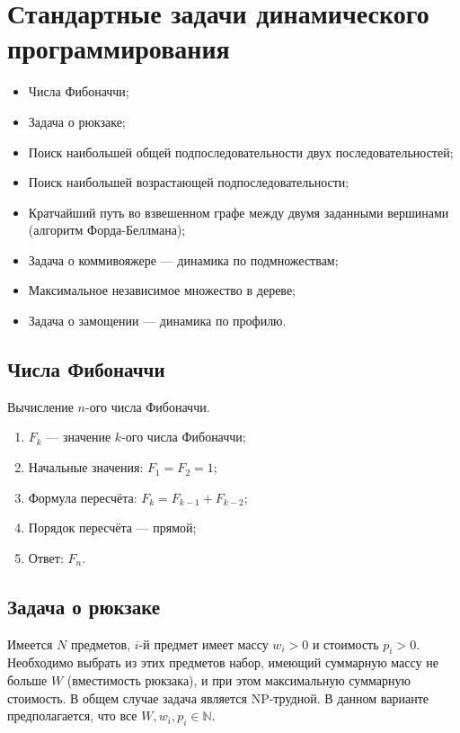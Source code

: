 \section{Стандартные задачи динамического программирования}

\begin{itemize}
\item Числа Фибоначчи;
\item Задача о рюкзаке;
\item Поиск наибольшей общей подпоследовательности двух последовательностей;
\item Поиск наибольшей возрастающей подпоследовательности;
\item Кратчайший путь во взвешенном графе между двумя заданными вершинами (алгоритм Форда-Беллмана);
\item Задача о коммивояжере --- динамика по подмножествам;
\item Максимальное независимое множество в дереве;
\item Задача о замощении --- динамика по профилю.
\end{itemize}

\subsection{Числа Фибоначчи}
Вычисление $n$-ого числа Фибоначчи.

\begin{enumerate}
\item $F_k$ --- значение $k$-ого числа Фибоначчи;
\item Начальные значения: $F_1 = F_2 = 1$;
\item Формула пересчёта: $F_k = F_{k-1} + F_{k-2}$;
\item Порядок пересчёта --- прямой;
\item Ответ: $F_n$.
\end{enumerate}

\subsection{Задача о рюкзаке}
Имеется $N$ предметов, $i$-й предмет имеет массу $w_i > 0$ и стоимость $p_i > 0$.
Необходимо выбрать из этих предметов набор, имеющий суммарную массу не больше $W$ (вместимость рюкзака),
и при этом максимальную суммарную стоимость.
В общем случае задача является NP-трудной. В данном варианте предполагается, что все $W, w_i, p_i \in \mathbb{N}$.

